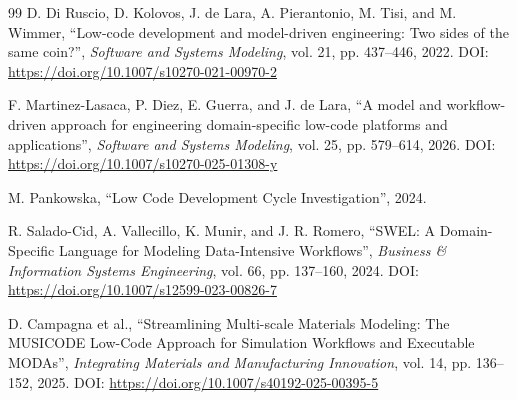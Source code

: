 \documentclass[12pt,a4paper]{article}
\begin{document}
\begin{thebibliography}{99}
D. Di Ruscio, D. Kolovos, J. de Lara, A. Pierantonio, M. Tisi, and M. Wimmer, ``Low-code development and model-driven engineering: Two sides of the same coin?'', \textit{Software and Systems Modeling}, vol. 21, pp. 437--446, 2022. DOI: \url{https://doi.org/10.1007/s10270-021-00970-2}

F. Martinez-Lasaca, P. Diez, E. Guerra, and J. de Lara, ``A model and workflow-driven approach for engineering domain-specific low-code platforms and applications'', \textit{Software and Systems Modeling}, vol. 25, pp. 579--614, 2026. DOI: \url{https://doi.org/10.1007/s10270-025-01308-y}

M. Pankowska, ``Low Code Development Cycle Investigation'', 2024.

R. Salado-Cid, A. Vallecillo, K. Munir, and J. R. Romero, ``SWEL: A Domain-Specific Language for Modeling Data-Intensive Workflows'', \textit{Business \& Information Systems Engineering}, vol. 66, pp. 137--160, 2024. DOI: \url{https://doi.org/10.1007/s12599-023-00826-7}

D. Campagna et al., ``Streamlining Multi-scale Materials Modeling: The MUSICODE Low-Code Approach for Simulation Workflows and Executable MODAs'', \textit{Integrating Materials and Manufacturing Innovation}, vol. 14, pp. 136--152, 2025. DOI: \url{https://doi.org/10.1007/s40192-025-00395-5}

\end{thebibliography}
\end{document}
